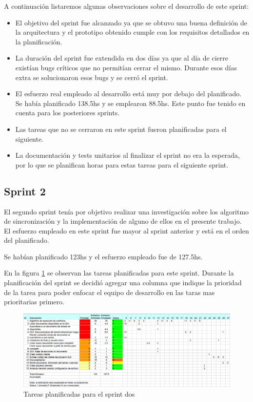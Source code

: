 \documentclass[12pt,a4paper]{article}
\begin{document}
A continuación listaremos algunas observaciones sobre el desarrollo de este sprint:

\begin{itemize}
\item El objetivo del sprint fue alcanzado ya que se obtuvo una buena definición de la arquitectura y el prototipo
obtenido cumple con los requisitos detallados en la planificación.
\item La duración del sprint fue extendida en dos días ya que al día de cierre existían bugs críticos que no permitían
cerrar el mismo. Durante esos días extra se solucionaron esos bugs y se cerró el sprint.
\item El esfuerzo real empleado al desarrollo está muy por debajo del planificado. Se había planificado 138.5hs y se
emplearon 88.5hs. Este punto fue tenido en cuenta para los posteriores sprints.
\item Las tareas que no se cerraron en este sprint fueron planificadas para el siguiente.
\item La documentación y tests unitarios al finalizar el sprint no era la esperada, por lo que se planifican
horas para estas tareas para el siguiente sprint.
\end{itemize}

\subsection{Sprint 2}

El segundo sprint tenía por objetivo realizar una investigación sobre los algoritmo de sincronización y la implementación
de alguno de ellos en el presente trabajo. El esfuerzo empleado en este sprint fue mayor al sprint anterior y está
en el orden del planificado.

Se habían planificado 123hs y el esfuerzo empleado fue de 127.5hs.

En la figura \ref{sprint2-tareas} se observan las tareas planificadas para este sprint. Durante la planificación del
sprint se decidió agregar una columna que indique la prioridad de la tarea para poder enfocar el equipo de desarrollo
en las taras mas prioritarias primero.

	\begin{figure}[!ht]
		\begin{center}
			\includegraphics[width=14cm]{sprint2.png}
			\caption{\label{sprint2-tareas} Tareas planificadas para el sprint dos }
		\end{center}
	\end{figure}
\end{document}
